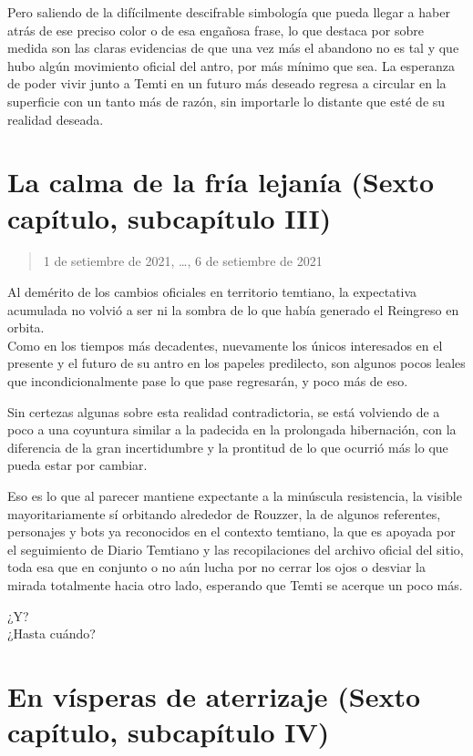\documentclass[
  spanish,
]{book}
\begin{document}
Pero saliendo de la difícilmente descifrable simbología que pueda llegar a haber atrás de ese preciso color o de esa engañosa frase, lo que destaca por sobre medida son las claras evidencias de que una vez más el abandono no es tal y que hubo algún movimiento oficial del antro, por más mínimo que sea. La esperanza de poder vivir junto a Temti en un futuro más deseado regresa a circular en la superficie con un tanto más de razón, sin importarle lo distante que esté de su realidad deseada.

\hypertarget{la-calma-de-la-fruxeda-lejanuxeda-sexto-capuxedtulo-subcapuxedtulo-iii}{%
\section{La calma de la fría lejanía (Sexto capítulo, subcapítulo III)}\label{la-calma-de-la-fruxeda-lejanuxeda-sexto-capuxedtulo-subcapuxedtulo-iii}}

\begin{quote}
1 de setiembre de 2021, \ldots, 6 de setiembre de 2021
\end{quote}

Al demérito de los cambios oficiales en territorio temtiano, la expectativa acumulada no volvió a ser ni la sombra de lo que había generado el Reingreso en orbita.\\
Como en los tiempos más decadentes, nuevamente los únicos interesados en el presente y el futuro de su antro en los papeles predilecto, son algunos pocos leales que incondicionalmente pase lo que pase regresarán, y poco más de eso.

Sin certezas algunas sobre esta realidad contradictoria, se está volviendo de a poco a una coyuntura similar a la padecida en la prolongada hibernación, con la diferencia de la gran incertidumbre y la prontitud de lo que ocurrió más lo que pueda estar por cambiar.

Eso es lo que al parecer mantiene expectante a la minúscula resistencia, la visible mayoritariamente sí orbitando alrededor de Rouzzer, la de algunos referentes, personajes y bots ya reconocidos en el contexto temtiano, la que es apoyada por el seguimiento de Diario Temtiano y las recopilaciones del archivo oficial del sitio, toda esa que en conjunto o no aún lucha por no cerrar los ojos o desviar la mirada totalmente hacia otro lado, esperando que Temti se acerque un poco más.

¿Y?\\
¿Hasta cuándo?

\hypertarget{en-vuxedsperas-de-aterrizaje-sexto-capuxedtulo-subcapuxedtulo-iv}{%
\section{En vísperas de aterrizaje (Sexto capítulo, subcapítulo IV)}\label{en-vuxedsperas-de-aterrizaje-sexto-capuxedtulo-subcapuxedtulo-iv}}
\end{document}
